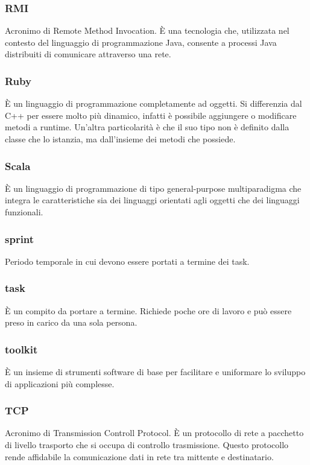     \subsubsection{\label{RMI}RMI}
      Acronimo di Remote Method Invocation. È una tecnologia che, utilizzata nel contesto del linguaggio di programmazione Java, consente a processi Java distribuiti di comunicare attraverso una rete.
    \subsubsection{\label{Ruby}Ruby}
      È un linguaggio di programmazione completamente ad oggetti. Si differenzia dal C++ per essere molto più dinamico, infatti è possibile aggiungere o modificare metodi a runtime. Un'altra particolarità è che il suo tipo non è definito dalla classe che lo istanzia, ma dall'insieme dei metodi che possiede.
    \subsubsection{\label{Scala}Scala}
      È un linguaggio di programmazione di tipo general-purpose multiparadigma che integra le caratteristiche sia dei linguaggi orientati agli oggetti che dei linguaggi funzionali.
    \subsubsection{\label{Sprint}sprint}
      Periodo temporale in cui devono essere portati a termine dei task.
    \subsubsection{\label{Task}task}
      È un compito da portare a termine. Richiede poche ore di lavoro e può essere preso in carico da una sola persona.
    \subsubsection{\label{Tool}toolkit}
      È un insieme di strumenti software di base per facilitare e uniformare lo sviluppo di applicazioni più complesse.
    \subsubsection{\label{TCP}TCP}
      Acronimo di Transmission Controll Protocol. È un protocollo di rete a pacchetto di livello trasporto che si occupa di controllo trasmissione. Questo protocollo rende affidabile la comunicazione dati in rete tra mittente e destinatario.
